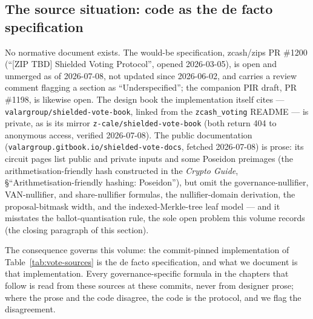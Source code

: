 \documentclass[11pt,a4paper]{article}
\theoremstyle{definition}
\begin{document}
\subsection{The source situation: code as the de facto specification}
\label{sec:vote-source-situation}

No normative document exists. The would-be specification, zcash/zips PR
\#1200 (``[ZIP TBD] Shielded Voting Protocol'', opened 2026-03-05), is open
and unmerged as of 2026-07-08, not updated since 2026-06-02, and carries a
review comment flagging a section as ``Underspecified''; the companion PIR
draft, PR \#1198, is likewise open. The design
book the implementation itself cites --- \texttt{valargroup/shielded-vote-book},
linked from the \texttt{zcash\_voting} README --- is private, as is its
mirror \texttt{z-cale/shielded-vote-book} (both return 404 to anonymous
access, verified 2026-07-08). The public documentation
(\texttt{valargroup.gitbook.io/shielded-vote-docs}, fetched 2026-07-08) is
prose: its circuit pages list public and private inputs and some Poseidon
preimages (the arithmetisation-friendly hash constructed in the
\emph{Crypto Guide}, \S``Arithmetisation-friendly hashing: Poseidon''),
but omit the governance-nullifier, VAN-nullifier, and
share-nullifier formulas, the nullifier-domain derivation, the
proposal-bitmask width, and the indexed-Merkle-tree leaf model --- and it
misstates the ballot-quantisation rule, the sole open problem this volume
records (the closing paragraph of this section).

The consequence governs this volume: the commit-pinned implementation of
Table~\ref{tab:vote-sources} is the de facto specification, and what we
document is that implementation. Every governance-specific formula in the
chapters that follow is read from these sources at these commits, never from
designer prose; where the prose and the code disagree, the code is the
protocol, and we flag the disagreement.
\end{document}
